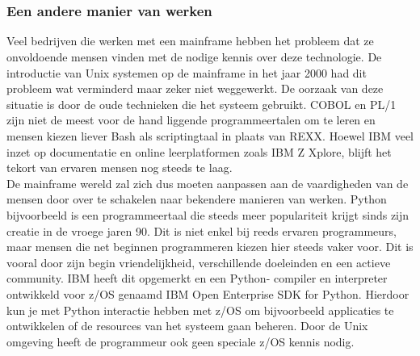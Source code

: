 \chapter{}%
\label{ch:stand-van-zaken}



\subsection{Een andere manier van werken}
Veel bedrijven die werken met een mainframe hebben het probleem dat ze onvoldoende mensen vinden met de nodige kennis over deze technologie. De introductie van Unix systemen op de mainframe in het jaar 2000 \autocite{Mertic2020} had dit probleem wat verminderd maar zeker niet weggewerkt. De oorzaak van deze situatie is door de oude technieken die het systeem gebruikt. COBOL en PL/1 zijn niet de meest voor de hand liggende programmeertalen om te leren en mensen kiezen liever Bash als scriptingtaal in plaats van REXX. Hoewel IBM veel inzet op documentatie en online leerplatformen zoals IBM Z Xplore, blijft het tekort van ervaren mensen nog steeds te laag. \\

De mainframe wereld zal zich dus moeten aanpassen aan de vaardigheden van de mensen door over te schakelen naar bekendere manieren van werken. 
Python bijvoorbeeld is een programmeertaal die steeds meer populariteit krijgt sinds zijn creatie in de vroege jaren 90. Dit is niet enkel bij reeds ervaren programmeurs, maar mensen die net beginnen programmeren kiezen hier steeds vaker voor. Dit is vooral door zijn begin vriendelijkheid, verschillende doeleinden en een actieve community. \autocite{Johnson2023}
IBM heeft dit opgemerkt en een Python- compiler en interpreter ontwikkeld voor z/OS genaamd IBM Open Enterprise SDK for Python. Hierdoor kun je met Python interactie hebben met z/OS om bijvoorbeeld applicaties te ontwikkelen of de resources van het systeem gaan beheren. Door de Unix omgeving heeft de programmeur ook geen speciale z/OS kennis nodig. \autocite{Klaey2023}

